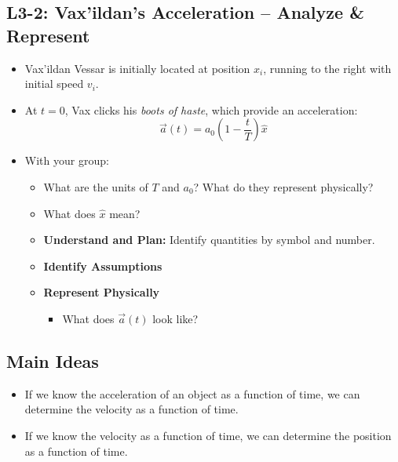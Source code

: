 \documentclass[]{article}
\begin{document}
\begin{PresentSpace}
\vspace{-10pt}
\section*{L3-2: Vax'ildan's Acceleration -- Analyze \& Represent}
\vspace{-20pt}
\begin{multicols}{2}
\begin{itemize}
	\item Vax'ildan Vessar is initially located at position $x_{i}$, running to the right with initial speed $v_{i}$.
	\item At $t=0$, Vax clicks his \textit{boots of haste}, which provide an acceleration:
	\[
	\vec{a}(t) = a_{0}\left(1-\frac{t}{T}\right)\hat{x}
	\]
	\vspace{40pt}
	\item With your group:
	\begin{itemize}
		\item What are the units of $T$ and $a_{0}$? What do they represent physically?
		\item What does $\hat{x}$ mean?
		\item \textbf{Understand and Plan:} Identify quantities by symbol and number.
		\item \textbf{Identify Assumptions}
		\item \textbf{Represent Physically}
		\begin{itemize}
			\item What does $\vec{a}(t)$ look like?
		\end{itemize}
	\end{itemize}
\end{itemize}
\end{multicols}
\end{PresentSpace}
\newpage
\begin{TeacherMargin}

\end{TeacherMargin}
\begin{PresentSpace}
\section*{Main Ideas}
\begin{itemize}
	\item If we know the acceleration of an object as a function of time, we can determine the velocity as a function of time.
	\item If we know the velocity as a function of time, we can determine the position as a function of time.
\end{itemize}
\end{PresentSpace}
\end{document}

